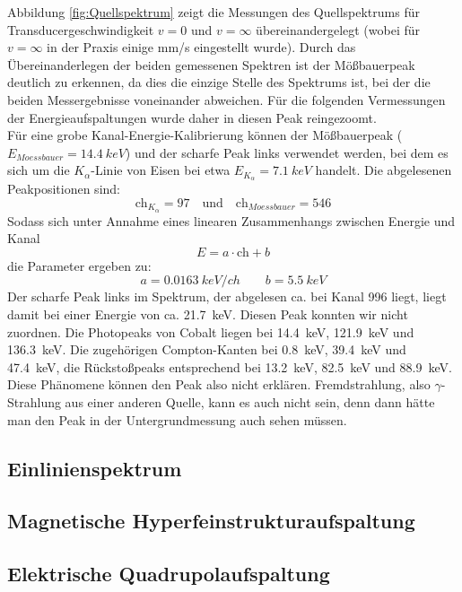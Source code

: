 \documentclass[12pt,a4paper]{article}
\begin{document}
Abbildung \ref{fig:Quellspektrum} zeigt die Messungen des Quellspektrums für Transducergeschwindigkeit $v = 0$ und $v = \infty$ übereinandergelegt (wobei für $v = \infty$ in der Praxis einige mm/s eingestellt wurde). Durch das Übereinanderlegen der beiden gemessenen Spektren ist der Mößbauerpeak deutlich zu erkennen, da dies die einzige Stelle des Spektrums ist, bei der die beiden Messergebnisse voneinander abweichen. Für die folgenden Vermessungen der Energieaufspaltungen wurde daher in diesen Peak reingezoomt.\\
Für eine grobe Kanal-Energie-Kalibrierung können der Mößbauerpeak ($E_{Moessbauer} = \SI{14,4}{keV}$) und der scharfe Peak links verwendet werden, bei dem es sich um die $K_{\alpha}$-Linie von Eisen bei etwa $E_{K_{\alpha}} = \SI{7,1}{keV}$ handelt. Die abgelesenen Peakpositionen sind:
\begin{equation*}
\textrm{ch} _{K_{\alpha}} = 97 \quad \textrm{und} \quad \textrm{ch} _{Moessbauer} = 546 
\end{equation*}
Sodass sich unter Annahme eines linearen Zusammenhangs zwischen Energie und Kanal
\begin{equation*}
E = a \cdot \textrm{ch} + b
\end{equation*}
die Parameter ergeben zu:
\begin{equation*}
a = \SI{0,0163}{keV/ch} \qquad b = \SI{5,5}{keV}
\end{equation*}
Der scharfe Peak links im Spektrum, der abgelesen ca. bei Kanal 996 liegt, liegt damit bei einer Energie von ca. \SI{21,7}{keV}. Diesen Peak konnten wir nicht zuordnen. Die Photopeaks von Cobalt liegen bei \SI{14,4}{keV}, \SI{121,9}{keV} und \SI{136,3}{keV}. Die zugehörigen Compton-Kanten bei \SI{0,8}{keV}, \SI{39,4}{keV} und \SI{47,4}{keV}, die Rückstoßpeaks entsprechend bei \SI{13,2}{keV}, \SI{82,5}{keV} und \SI{88,9}{keV}. Diese Phänomene können den Peak also nicht erklären. Fremdstrahlung, also $\gamma$-Strahlung aus einer anderen Quelle, kann es auch nicht sein, denn dann hätte man den Peak in der Untergrundmessung auch sehen müssen.  

\subsection{Einlinienspektrum}
\subsection{Magnetische Hyperfeinstrukturaufspaltung}
\subsection{Elektrische Quadrupolaufspaltung}
\end{document}
